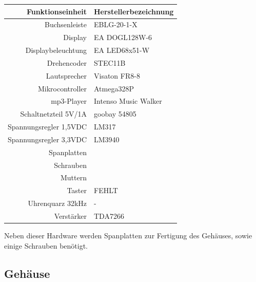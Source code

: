 \documentclass[journal, a4paper]{IEEEtran}
\begin{document}
		\begin{center}
			\begin{tabular}{rl}
				\toprule
				Funktionseinheit & Herstellerbezeichnung \\
				\midrule
				Buchsenleiste & EBLG-20-1-X\\
				Display & EA DOGL128W-6 \\
				Displaybeleuchtung & EA LED68x51-W\\
				Drehencoder & STEC11B \\
				Lautsprecher & Visaton FR8-8 \\
				Mikrocontroller & Atmega328P \\
				mp3-Player & Intenso Music Walker \\
				Schaltnetzteil 5V/1A & goobay 54805 \\
				Spannungsregler 1,5VDC & LM317\\
				Spannungsregler 3,3VDC & LM3940 \\
				Spanplatten & \\
				Schrauben &\\
				Muttern&\\
				Taster & FEHLT \\
				Uhrenquarz 32kHz& - \\			
				Verstärker & TDA7266 \\
				\bottomrule		
			\end{tabular}
			\label{tab:Bauteile}
		\end{center}
		Neben dieser Hardware werden Spanplatten zur Fertigung des Gehäuses, sowie einige Schrauben benötigt.

	\subsection{Gehäuse}	
\end{document}
